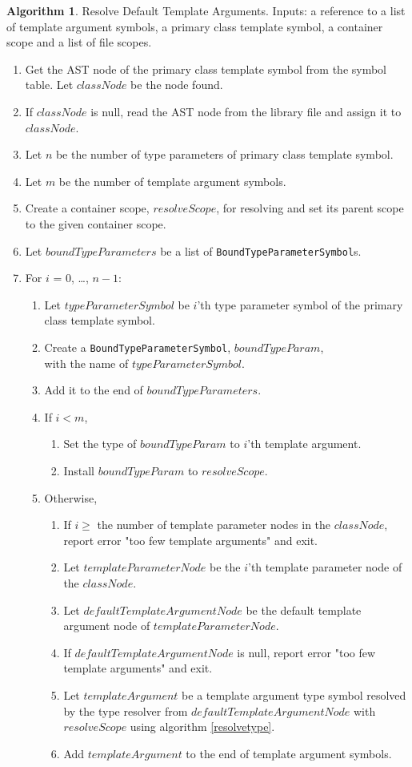 \documentclass[a4paper,oneside,11pt]{book}
\theoremstyle{definition}
\newtheorem{algo}{Algorithm}[section]
\begin{document}
\begin{algo}\label{resolvedefaulttypearguments} Resolve Default Template Arguments. Inputs: a reference to a list of template argument symbols,
    a primary class template symbol, a container scope and a list of file scopes.
\begin{enumerate}
\item
Get the AST node of the primary class template symbol from the symbol table. Let $classNode$ be the node found.
\item
If $classNode$ is null, read the AST node from the library file and assign it to $classNode$.
\item
Let $n$ be the number of type parameters of primary class template symbol.
\item
Let $m$ be the number of template argument symbols.
\item
Create a container scope, $resolveScope$, for resolving and set its parent scope to the given container scope.
\item
Let $boundTypeParameters$ be a list of \verb|BoundTypeParameterSymbol|s.
\item
For $i$ = 0, \ldots, $n - 1$:
\begin{enumerate}
\item
Let $typeParameterSymbol$ be $i$'th type parameter symbol of the primary class template symbol.
\item
Create a \verb|BoundTypeParameterSymbol|, $boundTypeParam$,\\ with the name of $typeParameterSymbol$.
\item
Add it to the end of $boundTypeParameters$.
\item
If $i < m$,
\begin{enumerate}
\item
Set the type of $boundTypeParam$ to $i$'th template argument.
\item
Install $boundTypeParam$ to $resolveScope$.
\end{enumerate}
\item
Otherwise,
\begin{enumerate}
\item
If $i \ge $ the number of template parameter nodes in the $classNode$, report error "too few template arguments" and exit.
\item
Let $templateParameterNode$ be the $i$'th template parameter node of the $classNode$.
\item
Let $defaultTemplateArgumentNode$ be the default template argument node of $templateParameterNode$.
\item
If $defaultTemplateArgumentNode$ is null, report error "too few template arguments" and exit.
\item
Let $templateArgument$ be a template argument type symbol resolved by the type resolver from $defaultTemplateArgumentNode$ with $resolveScope$
using algorithm \ref{resolvetype}.
\item
Add $templateArgument$ to the end of template argument symbols.
\end{enumerate}
\end{enumerate}
\end{enumerate}
\end{algo}
\end{document}
